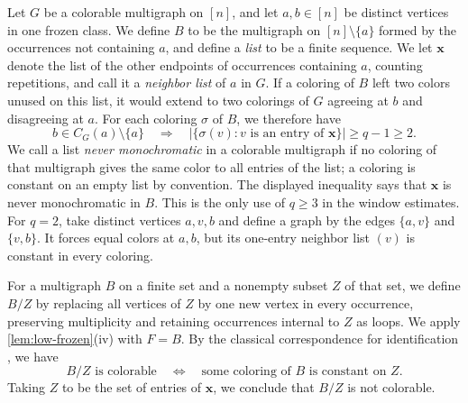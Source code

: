 Let $G$ be a colorable multigraph on $[n]$, and let $a, b \in [n]$ be distinct vertices in one frozen class. We define $B$ to be the multigraph on $[n] \setminus \{a\}$ formed by the occurrences not containing $a$, and define a \emph{list} to be a finite sequence. We let $\mathbf x$ denote the list of the other endpoints of occurrences containing $a$, counting repetitions, and call it a \emph{neighbor list} of $a$ in $G$. If a coloring of $B$ left two colors unused on this list, it would extend to two colorings of $G$ agreeing at $b$ and disagreeing at $a$. For each coloring $\sigma$ of $B$, we therefore have
\[
b \in C_G(a) \setminus \{a\}
\quad\Longrightarrow\quad
\bigl|\{\sigma(v):v\text{ is an entry of }\mathbf x\}\bigr| \ge q - 1 \ge 2.
\]
We call a list \emph{never monochromatic} in a colorable multigraph if no coloring of that multigraph gives the same color to all entries of the list; a coloring is constant on an empty list by convention. The displayed inequality says that $\mathbf x$ is never monochromatic in $B$. This is the only use of $q \ge 3$ in the window estimates. For $q = 2$, take distinct vertices $a, v, b$ and define a graph by the edges $\{a, v\}$ and $\{v, b\}$. It forces equal colors at $a, b$, but its one-entry neighbor list $(v)$ is constant in every coloring.

For a multigraph $B$ on a finite set and a nonempty subset $Z$ of that set, we define $B/Z$ by replacing all vertices of $Z$ by one new vertex in every occurrence, preserving multiplicity and retaining occurrences internal to $Z$ as loops. We apply \cref{lem:low-frozen}(iv) with $F = B$. By the classical correspondence for identification \cite[Section~3, Theorem~1]{read1968introduction}, we have
\[
B/Z\text{ is colorable}\quad\Longleftrightarrow\quad
\text{some coloring of }B\text{ is constant on }Z.
\]
Taking $Z$ to be the set of entries of $\mathbf x$, we conclude that $B/Z$ is not colorable.

